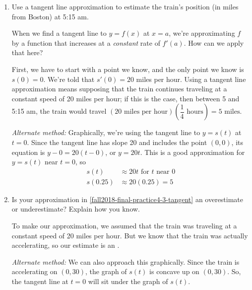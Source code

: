 \documentclass{article}
\theoremstyle{theorem}
\begin{document}
\begin{enumerate}
  \begin{enumerate} 
  \item \label{fall2018-final-practice4-3-tangent}

    \begin{problem}[\stretch{0.75}]
      Use a tangent line approximation to estimate the train's position (in miles from Boston) at 5:15 am.
    \end{problem}

    \begin{solution}
      When we find a tangent line to $y = f(x)$ at $x = a$, we're approximating $f$ by a function that increases at a \emph{constant} rate of $f'(a)$. How can we apply that here? 

      First, we have to start with a point we know, and the only point we know is $s(0) = 0$. We're told that $s'(0) = 20$ miles per hour. Using a tangent line approximation means supposing that the train continues traveling at a constant speed of 20 miles per hour; if this is the case, then between 5 and 5:15 am, the train would travel $(20 \text{ miles per hour}) \left( \dfrac{1}{4} \text{ hours} \right) = \boxed{5 \text{ miles}}$.

      \emph{Alternate method:} Graphically, we're using the tangent line to $y = s(t)$ at $t = 0$. Since the tangent line has slope 20 and includes the point $(0, 0)$, its equation is $y - 0 = 20 (t - 0)$, or $y = 20t$. This is a good approximation for $y = s(t)$ near $t = 0$, so
      \begin{align*}
        s(t) & \approx 20t \text{ for $t$ near 0} \\
        s(0.25) & \approx 20(0.25) = 5
      \end{align*}
    \end{solution}

  \item
    \begin{problem}[\stretch{0.3}]
      Is your approximation in \ref{fall2018-final-practice4-3-tangent} an overestimate or underestimate? Explain how you know.
    \end{problem}

    \begin{solution}
      To make our approximation, we assumed that the train was traveling at a constant speed of 20 miles per hour. But we know that the train was actually accelerating, so our estimate is an .

      \emph{Alternate method:} We can also approach this graphically. Since the train is accelerating on $(0, 30)$, the graph of $s(t)$ is concave up on $(0, 30)$. So, the tangent line at $t = 0$ will sit under the graph of $s(t)$.
    \end{solution}


\end{enumerate}
\end{enumerate}
\end{document}
